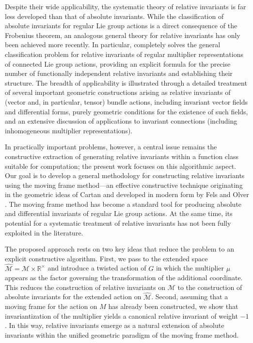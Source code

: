 \documentclass[12pt,reqno]{amsart}
\begin{document}
Despite their wide applicability, the systematic theory of relative invariants is far less developed than that of
absolute invariants. While the classification of absolute invariants for regular Lie group actions is a direct
consequence of the Frobenius theorem, an analogous general theory for relative invariants has only been achieved
more recently. In particular, \cite{Olver1997, Olver1995} completely solves the general classification problem
for relative invariants of regular multiplier representations of connected Lie group actions, providing an
{explicit formula} for the precise number of functionally independent relative invariants and establishing
their structure. The breadth of applicability is illustrated through a detailed treatment of several important
geometric constructions arising as relative invariants of (vector and, in particular, tensor) bundle actions,
including invariant vector fields and differential forms, purely geometric conditions for the existence of such
fields, and an extensive discussion of applications to invariant connections (including inhomogeneous multiplier
representations).

In practically important problems, however, a central issue remains the {constructive} extraction of
generating relative invariants within a function class suitable for computation; the present work focuses on this
algorithmic aspect. Our goal is to develop a general methodology for constructing relative invariants using the
moving frame method---an effective constructive technique originating in the geometric ideas of Cartan and
developed in modern form by Fels and Olver \cite{Olver1998, Olver1999-1}. The moving frame method has become a
standard tool for producing absolute and differential invariants of regular Lie group actions. At the same time,
its potential for a systematic treatment of {relative} invariants has not been fully exploited in the
literature.

The proposed approach rests on two key ideas that reduce the problem to an explicit constructive algorithm.
First, we pass to the {extended space} $\widehat{\mathcal M} = \mathcal M\times\mathbb R^\times$ and introduce a {twisted
action} of $G$ in which the multiplier $\mu$ appears as the factor governing the transformation of the additional
coordinate. This reduces the construction of relative invariants on $\mathcal M$ to the construction of absolute
invariants for the extended action on $\widehat{\mathcal  M}$. Second, assuming that a moving frame for the action on $M$ has
already been constructed, we show that {invariantization} of the multiplier yields a canonical relative
invariant of weight $-1$. In this way, relative invariants emerge as a natural extension of absolute invariants
within the unified geometric paradigm of the moving frame method.
\end{document}
